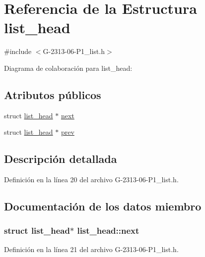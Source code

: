 \hypertarget{structlist__head}{}\section{Referencia de la Estructura list\+\_\+head}
\label{structlist__head}


{\ttfamily \#include $<$G-\/2313-\/06-\/\+P1\+\_\+list.\+h$>$}



Diagrama de colaboración para list\+\_\+head\+:
\subsection*{Atributos públicos}
\begin{DoxyCompactItemize}
\item 
struct \hyperlink{structlist__head}{list\+\_\+head} $\ast$ \hyperlink{structlist__head_ac3b0ff0dfb978a0cfbdad6b9d19cdcfe}{next}
\item 
struct \hyperlink{structlist__head}{list\+\_\+head} $\ast$ \hyperlink{structlist__head_aaa0eabda8877e1d6de73a33f223ad004}{prev}
\end{DoxyCompactItemize}


\subsection{Descripción detallada}


Definición en la línea 20 del archivo G-\/2313-\/06-\/\+P1\+\_\+list.\+h.



\subsection{Documentación de los datos miembro}
\subsubsection[{\texorpdfstring{next}{next}}]{\setlength{\rightskip}{0pt plus 5cm}struct {\bf list\+\_\+head}$\ast$ list\+\_\+head\+::next}\hypertarget{structlist__head_ac3b0ff0dfb978a0cfbdad6b9d19cdcfe}{}\label{structlist__head_ac3b0ff0dfb978a0cfbdad6b9d19cdcfe}


Definición en la línea 21 del archivo G-\/2313-\/06-\/\+P1\+\_\+list.\+h.

